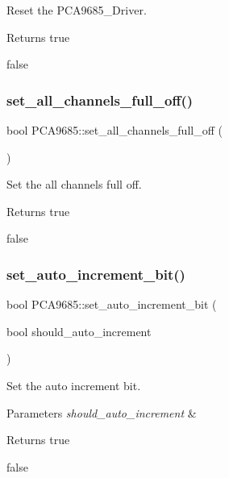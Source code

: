 Reset the P\+C\+A9685\+\_\+\+Driver. 

\begin{DoxyReturn}{Returns}
true 

false 
\end{DoxyReturn}
\mbox{\label{class_p_c_a9685_aec57fdfeddc3f1bf4b3e307020928a07}} 
\subsubsection{\texorpdfstring{set\+\_\+all\+\_\+channels\+\_\+full\+\_\+off()}{set\_all\_channels\_full\_off()}}
{\footnotesize\ttfamily bool P\+C\+A9685\+::set\+\_\+all\+\_\+channels\+\_\+full\+\_\+off (\begin{DoxyParamCaption}{ }\end{DoxyParamCaption})}



Set the all channels full off. 

\begin{DoxyReturn}{Returns}
true 

false 
\end{DoxyReturn}
\mbox{\label{class_p_c_a9685_a0c8505ee0fe58fd866ed20399e7f4bc3}} 
\subsubsection{\texorpdfstring{set\+\_\+auto\+\_\+increment\+\_\+bit()}{set\_auto\_increment\_bit()}}
{\footnotesize\ttfamily bool P\+C\+A9685\+::set\+\_\+auto\+\_\+increment\+\_\+bit (\begin{DoxyParamCaption}\item[{bool}]{should\+\_\+auto\+\_\+increment }\end{DoxyParamCaption})}



Set the auto increment bit. 


\begin{DoxyParams}{Parameters}
{\em should\+\_\+auto\+\_\+increment} & \\
\hline
\end{DoxyParams}
\begin{DoxyReturn}{Returns}
true 

false 
\end{DoxyReturn}
\mbox{\label{class_p_c_a9685_a665c5df20c91bee8edcc18418412dc83}} 
